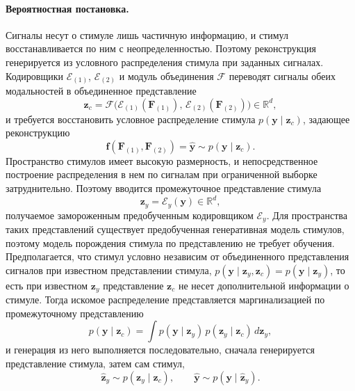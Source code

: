 \paragraph{Вероятностная постановка.}
Сигналы несут о стимуле лишь частичную информацию, и стимул восстанавливается по ним с неопределенностью. Поэтому реконструкция генерируется из условного распределения стимула при заданных сигналах. Кодировщики $\mathcal{E}_{(1)}$, $\mathcal{E}_{(2)}$ и модуль объединения $\mathcal{F}$ переводят сигналы обеих модальностей в объединенное представление
\begin{equation}\label{eq:zc}
\mathbf{z}_c = \mathcal{F}\big(\mathcal{E}_{(1)}(\mathbf{F}_{(1)}),\, \mathcal{E}_{(2)}(\mathbf{F}_{(2)})\big) \in \mathbb{R}^{d},
\end{equation}
и требуется восстановить условное распределение стимула $p(\mathbf{y} \mid \mathbf{z}_c)$, задающее реконструкцию
\begin{equation}\label{eq:target_prob}
\mathbf{f}(\mathbf{F}_{(1)}, \mathbf{F}_{(2)}) = \widehat{\mathbf{y}} \sim p(\mathbf{y} \mid \mathbf{z}_c).
\end{equation}
Пространство стимулов имеет высокую размерность, и непосредственное построение распределения в нем по сигналам при ограниченной выборке затруднительно. Поэтому вводится промежуточное представление стимула
\begin{equation*}
\mathbf{z}_y = \mathcal{E}_y(\mathbf{y}) \in \mathbb{R}^{d},
\end{equation*}
получаемое замороженным предобученным кодировщиком $\mathcal{E}_y$. Для пространства таких представлений существует предобученная генеративная модель стимулов, поэтому модель порождения стимула по представлению не требует обучения. Предполагается, что стимул условно независим от объединенного представления сигналов при известном представлении стимула, $p(\mathbf{y} \mid \mathbf{z}_y, \mathbf{z}_c) = p(\mathbf{y} \mid \mathbf{z}_y)$, то есть при известном $\mathbf{z}_y$ представление $\mathbf{z}_c$ не несет дополнительной информации о стимуле. Тогда искомое распределение представляется маргинализацией по промежуточному представлению
\begin{equation}\label{eq:marg}
p(\mathbf{y} \mid \mathbf{z}_c) = \int p(\mathbf{y} \mid \mathbf{z}_y)\, p(\mathbf{z}_y \mid \mathbf{z}_c)\, d\mathbf{z}_y ,
\end{equation}
и генерация из него выполняется последовательно, сначала генерируется представление стимула, затем сам стимул,
\begin{equation*}
\widehat{\mathbf{z}}_y \sim p(\mathbf{z}_y \mid \mathbf{z}_c), \qquad \widehat{\mathbf{y}} \sim p(\mathbf{y} \mid \widehat{\mathbf{z}}_y).
\end{equation*}

